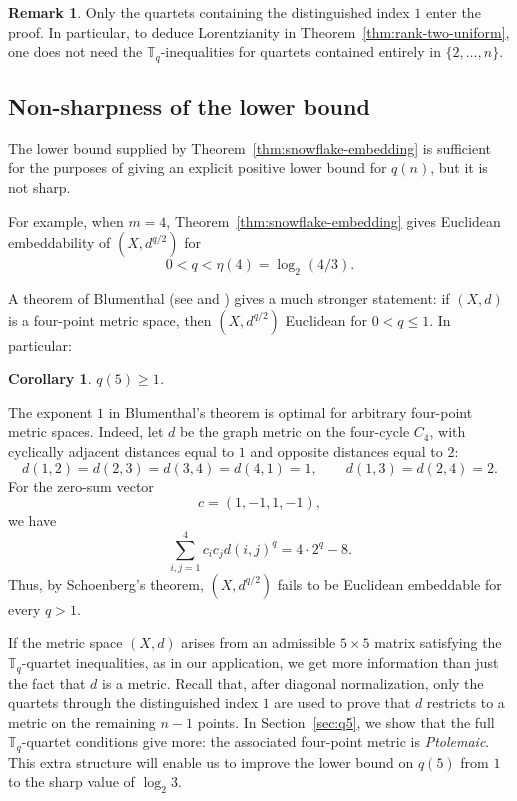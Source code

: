 \documentclass[12pt]{amsart}
\newtheorem{corollary}[theorem]{Corollary}
\theoremstyle{definition}
\newtheorem{remark}[theorem]{Remark}
\newcommand{\1}{\mathbf{1}}
\newcommand\T{{\mathbb T}}
\renewcommand\geq{\geqslant}
\begin{document}
\begin{remark}
\label{rem:quartets-through-1}
Only the quartets containing the distinguished index $1$ enter the proof.
In particular, to deduce Lorentzianity in Theorem~\ref{thm:rank-two-uniform}, one does not need
the $\T_q$-inequalities for quartets contained entirely in $\{2,\dots,n\}$.
\end{remark}



\subsection{Non-sharpness of the lower bound}
\label{subsec:snowflake-bound-not-sharp}

The lower bound supplied by Theorem~\ref{thm:snowflake-embedding} is sufficient for
the purposes of giving an explicit positive lower bound for $q(n)$, but it is not sharp.  

For example, when $m=4$, Theorem~\ref{thm:snowflake-embedding} gives Euclidean embeddability of
$(X,d^{q/2})$ for
\[
        0 < q<\eta(4)=\log_2(4/3).
\]

A theorem of Blumenthal (see \cite{Blumenthal1936} and \cite[Theorem~2.4]{MaeharaSurvey}) 
gives a much stronger statement: if $(X,d)$ is a four-point metric space, then $(X,d^{q/2})$ Euclidean for $0<q\le1$.
In particular:

\begin{corollary}
$q(5) \geq 1$.
\end{corollary}

The exponent $1$ in Blumenthal's theorem is optimal for arbitrary four-point metric spaces.  Indeed, let
$d$ be the graph metric on the four-cycle $C_4$, with cyclically adjacent
distances equal to $1$ and opposite distances equal to $2$:
\[
        d(1,2)=d(2,3)=d(3,4)=d(4,1)=1,
        \qquad
        d(1,3)=d(2,4)=2.
\]
For the zero-sum vector
\[
        c=(1,-1,1,-1),
\]
we have
\[
        \sum_{i,j=1}^4 c_i c_j d(i,j)^q
        =
        4\cdot 2^q-8.
\]
Thus, by Schoenberg's theorem, $(X,d^{q/2})$ fails to be Euclidean embeddable for every $q>1$.

If the metric space $(X,d)$ arises from an admissible $5 \times 5$ matrix satisfying the $\T_q$-quartet inequalities, as in our application, we get more information than just the fact that $d$ is a metric. Recall that, after diagonal normalization, only
the quartets through the distinguished index $1$ are used to prove that $d$ restricts to a metric on the remaining $n-1$ points.  
In Section~\ref{sec:q5}, we show that the full $\T_q$-quartet conditions give more: the associated four-point metric is
\emph{Ptolemaic}.  This extra structure will enable us to improve the lower bound on $q(5)$ from $1$ to the sharp value of $\log_2 3$.
\end{document}
